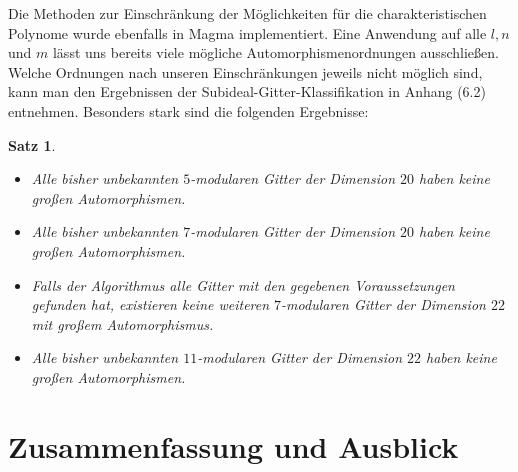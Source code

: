 \documentclass[12pt,a4paper,halfparskip,headsepline,bibtotocnumbered]{scrreprt}
\theoremstyle{nummermitklammern}
\newtheorem{satz}[defsatzusw]{Satz}
\theoremstyle{nonumberbreak}
\begin{document}
Die Methoden zur Einschränkung der Möglichkeiten für die charakteristischen Polynome wurde ebenfalls in Magma implementiert. Eine Anwendung auf alle $l, n$ und $m$ lässt uns bereits viele mögliche Automorphismenordnungen ausschließen. Welche Ordnungen nach unseren Einschränkungen jeweils nicht möglich sind, kann man den Ergebnissen der Subideal-Gitter-Klassifikation in Anhang (6.2) entnehmen. Besonders stark sind die folgenden Ergebnisse:

\begin{framed}
	\begin{satz}
		\begin{itemize}
			\item Alle bisher unbekannten $5$-modularen Gitter der Dimension $20$ haben keine großen Automorphismen.
			\item Alle bisher unbekannten $7$-modularen Gitter der Dimension $20$ haben keine großen Automorphismen.
			\item Falls der Algorithmus alle Gitter mit den gegebenen Voraussetzungen gefunden hat, existieren keine weiteren $7$-modularen Gitter der Dimension $22$ mit großem Automorphismus.
			\item Alle bisher unbekannten $11$-modularen Gitter der Dimension $22$ haben keine großen Automorphismen.
		\end{itemize}
	\end{satz}
\end{framed}


\chapter{Zusammenfassung und Ausblick}
\end{document}

